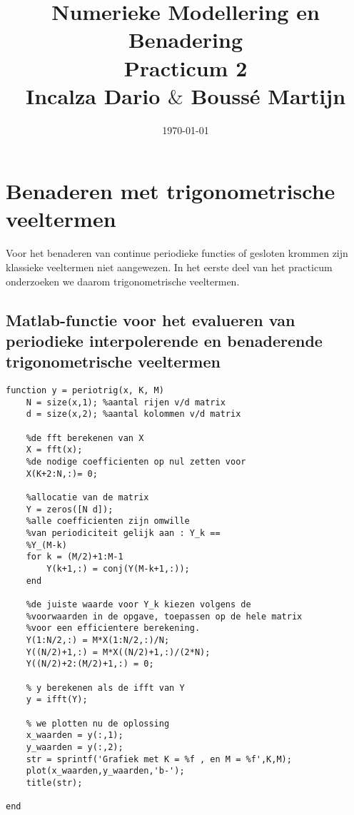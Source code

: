 \documentclass[10pt,a4paper]{article}
\begin{document}
\title{Numerieke Modellering en Benadering\\Practicum 2\\Incalza Dario $\&$ Bouss\'e Martijn}

\date{\today}

\maketitle

\newpage

\listoffigures




\newpage
\section{Benaderen met trigonometrische veeltermen}
Voor het benaderen van continue periodieke functies of gesloten krommen zijn klassieke veeltermen niet aangewezen. In het eerste deel van het practicum onderzoeken we daarom trigonometrische veeltermen.

\subsection{Matlab-functie voor het evalueren van periodieke interpolerende en benaderende trigonometrische
veeltermen}
\begin{lstlisting}
function y = periotrig(x, K, M)
    N = size(x,1); %aantal rijen v/d matrix
    d = size(x,2); %aantal kolommen v/d matrix

    %de fft berekenen van X
    X = fft(x);
    %de nodige coefficienten op nul zetten voor 
    X(K+2:N,:)= 0;

    %allocatie van de matrix
    Y = zeros([N d]);
    %alle coefficienten zijn omwille 
    %van periodiciteit gelijk aan : Y_k ==
    %Y_(M-k)
    for k = (M/2)+1:M-1
        Y(k+1,:) = conj(Y(M-k+1,:));
    end
    
	%de juiste waarde voor Y_k kiezen volgens de
    %voorwaarden in de opgave, toepassen op de hele matrix
    %voor een efficientere berekening.
    Y(1:N/2,:) = M*X(1:N/2,:)/N;
    Y((N/2)+1,:) = M*X((N/2)+1,:)/(2*N);
    Y((N/2)+2:(M/2)+1,:) = 0;
    
    % y berekenen als de ifft van Y
    y = ifft(Y);
    
    % we plotten nu de oplossing
    x_waarden = y(:,1);
    y_waarden = y(:,2);
    str = sprintf('Grafiek met K = %f , en M = %f',K,M);
    plot(x_waarden,y_waarden,'b-');
    title(str);

end

\end{lstlisting}
\end{document}
